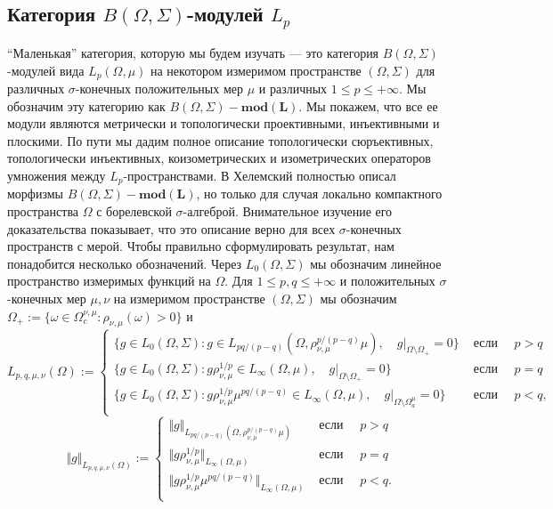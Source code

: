 
\subsection{Категория \texorpdfstring{$B(\Omega,\Sigma)$}{B(Omega,Sigma)}-модулей \texorpdfstring{$L_p$}{Lp}}
\label{SubSectionTheCategoryOfBOmegaSigmaModulesLp}

``Маленькая'' категория, которую мы будем изучать --- это категория $B(\Omega,\Sigma)$-модулей вида $L_p(\Omega,\mu)$ на некотором измеримом пространстве $(\Omega,\Sigma)$ для различных $\sigma$-конечных положительных мер $\mu$ и различных $1\leq p\leq +\infty$. Мы обозначим эту категорию как $B(\Omega,\Sigma)-\mathbf{mod(L)}$. Мы покажем, что все ее модули являются метрически и топологически проективными, инъективными и плоскими. По пути мы дадим полное описание топологически сюръективных, топологически инъективных, коизометрических и изометрических операторов умножения между $L_p$-пространствами. В \cite{HelTensProdAndMultModLp} Хелемский полностью описал морфизмы $B(\Omega,\Sigma)-\mathbf{mod(L)}$, но только для случая локально компактного пространства $\Omega$ с борелевской $\sigma$-алгеброй. Внимательное изучение его доказательства показывает, что это описание верно для всех $\sigma$-конечных пространств с мерой. Чтобы правильно сформулировать результат, нам понадобится несколько обозначений. Через $L_0(\Omega,\Sigma)$ мы обозначим линейное пространство измеримых функций на $\Omega$. Для $1\leq p,q\leq +\infty$ и положительных $\sigma$-конечных мер $\mu,\nu$ на измеримом пространстве $(\Omega,\Sigma)$ мы обозначим $\Omega_+:=\{\omega\in\Omega_c^{\nu,\mu}:\rho_{\nu,\mu}(\omega)>0\}$ и
$$
L_{p,q,\mu,\nu}(\Omega):=
\begin{cases}
\{g\in L_0(\Omega,\Sigma):g\in L_{pq/(p-q)}(\Omega,\rho_{\nu,\mu}^{p/(p-q)}\mu),\quad g|_{\Omega\setminus\Omega_+}=0\}&\text{ если }\quad p>q\\
\{g\in L_0(\Omega,\Sigma):g\rho_{\nu,\mu}^{1/p}\in L_{\infty}(\Omega,\mu),\quad g|_{\Omega\setminus\Omega_+}=0\}&\text{ если }\quad p=q\\
\{g\in L_0(\Omega,\Sigma):g\rho_{\nu,\mu}^{1/p}\mu^{pq/(p-q)}\in L_{\infty}(\Omega,\mu),\quad g|_{\Omega\setminus\Omega_a^{\mu}}=0\}&\text{ если }\quad p<q,\\
\end{cases}
$$
$$
\Vert g\Vert_{L_{p,q,\mu,\nu}(\Omega)}:=
\begin{cases}
\Vert g\Vert_{L_{pq/(p-q)}(\Omega,\rho_{\nu,\mu}^{p/(p-q)}\mu)}&\text{ если }\quad p>q\\
\Vert g\rho_{\nu,\mu}^{1/p}\Vert_{L_{\infty}(\Omega,\mu)}&\text{ если }\quad p=q\\
\Vert g\rho_{\nu,\mu}^{1/p}\mu^{pq/(p-q)}\Vert_{L_{\infty}(\Omega,\mu)}&\text{ если }\quad p<q.\\
\end{cases}
$$

